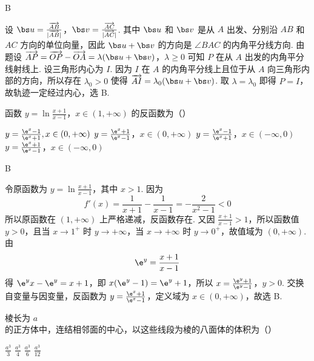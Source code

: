 \begin{answer}
B
\end{answer}

\begin{solution}
设 \(\bs u=\frac{\overrightarrow{AB}}{|\overrightarrow{AB}|}\)，\(\bs v=\frac{\overrightarrow{AC}}{|\overrightarrow{AC}|}\). 其中 \(\bs u\) 和 \(\bs v\) 是从 \(A\) 出发、分别沿 \(AB\) 和 \(AC\) 方向的单位向量，因此 \(\bs u+\bs v\) 的方向是 \(\angle BAC\) 的内角平分线方向. 由题设
\(\overrightarrow{AP}=\overrightarrow{OP}-\overrightarrow{OA}=\lambda(\bs u+\bs v)\)，\(\lambda\geqslant0\)
可知 \(P\) 在从 \(A\) 出发的内角平分线射线上. 设三角形内心为 \(I\). 因为 \(I\) 在 \(A\) 的内角平分线上且位于从 \(A\) 向三角形内部的方向，所以存在 \(\lambda_{0}>0\) 使得 \(\overrightarrow{AI}=\lambda_{0}(\bs u+\bs v)\). 取 \(\lambda=\lambda_{0}\) 即得 \(P=I\)，故轨迹一定经过内心，选 B.
\end{solution}

\begin{problem}
函数 \(y = \ln \frac{x + 1}{x - 1}\)，\(x \in (1, +\infty)\) 的反函数为（\quad）

\choices
    {\( y = \frac{\e^{x} - 1}{\e^{x} + 1}, x \in (0, +\infty) \)}
    {\(y = \frac{\e^{x} + 1}{\e^{x} - 1}\)，\(x \in (0, +\infty)\)}
    {\(y = \frac{\e^{x} - 1}{\e^{x} + 1}\)，\(x \in (-\infty, 0)\)}
    {\(y = \frac{\e^{x} + 1}{\e^{x} - 1}\)，\(x \in (-\infty, 0)\)}
\end{problem}

\begin{answer}
B
\end{answer}

\begin{solution}
令原函数为 \(y=\ln\frac{x+1}{x-1}\)，其中 \(x>1\). 因为
\[
f'(x)=\frac{1}{x+1}-\frac{1}{x-1}=-\frac{2}{x^{2}-1}<0
\]
所以原函数在 \((1,+\infty)\) 上严格递减，反函数存在. 又因 \(\frac{x+1}{x-1}>1\)，所以函数值 \(y>0\)，且当 \(x\to1^{+}\) 时 \(y\to+\infty\)，当 \(x\to+\infty\) 时 \(y\to0^{+}\)，故值域为 \((0,+\infty)\). 由
\[
\e^{y}=\frac{x+1}{x-1}
\]
得 \(\e^{y}x-\e^{y}=x+1\)，即 \(x(\e^{y}-1)=\e^{y}+1\)，所以
\(x=\frac{\e^{y}+1}{\e^{y}-1}\)，\(y>0\).
交换自变量与因变量，反函数为 \(y=\frac{\e^{x}+1}{\e^{x}-1}\)，定义域为 \(x\in(0,+\infty)\)，故选 B.
\end{solution}

\begin{problem}
棱长为 \(a\) 的正方体中，连结相邻面的中心，以这些线段为棱的八面体的体积为（\quad）

\choices
    {\(\frac{a^3}{3}\)}
    {\(\frac{a^3}{4}\)}
    {\(\frac{a^3}{6}\)}
    {\(\frac{a^3}{12}\)}
\end{problem}

